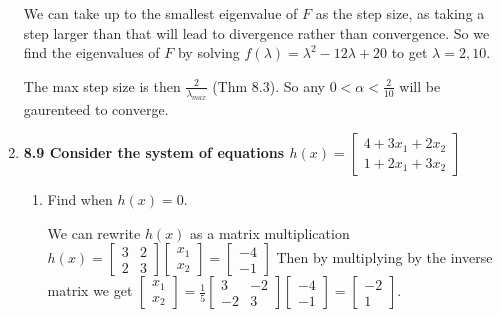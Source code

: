 \documentclass[10pt,a4paper]{article}
\begin{document}
\begin{enumerate}
        We can take up to the smallest eigenvalue of $F$ as the step size, as taking a step larger than that will lead to divergence rather than convergence. 
        So we find the eigenvalues of $F$ by solving $f(\lambda) = \lambda^2 - 12\lambda +20$ to get $\lambda = 2, 10$. 

        The max step size is then $\frac{2}{\lambda_{max}}$ (Thm 8.3). So any $0 < \alpha < \frac{2}{10}$ will be gaurenteed to converge.
            
    \item \textbf{8.9 Consider the system of equations $h(x) = \begin{bmatrix} 4+3x_1+2x_2 \\ 1+2x_1+3x_2\end{bmatrix}$ }
    \begin{enumerate}
        \item Find when $h(x) = 0$. 
        
        We can rewrite $h(x)$ as a matrix multiplication $h(x) = \begin{bmatrix} 3 & 2 \\ 2 & 3\end{bmatrix} \begin{bmatrix} x_1 \\x_2 \end{bmatrix} = \begin{bmatrix} -4 \\ -1 \end{bmatrix}$
        Then by multiplying by the inverse matrix we get $\begin{bmatrix} x_1 \\ x_2 \end{bmatrix} = \frac{1}{5}\begin{bmatrix}3 & -2 \\ -2 & 3 \end{bmatrix}\begin{bmatrix} -4 \\ -1 \end{bmatrix} = \begin{bmatrix} -2 \\ 1 \end{bmatrix}$.

    \end{enumerate}


\end{enumerate}
\end{document}
